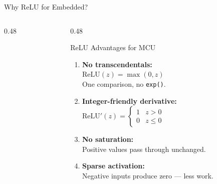 \documentclass[aspectratio=169, 10pt]{beamer}
\begin{document}
\begin{frame}{Why ReLU for Embedded?}
\begin{columns}[T]
\begin{column}{0.48\textwidth}
\begin{center}
\end{center}
\end{column}

\begin{column}{0.48\textwidth}
\begin{block}{ReLU Advantages for MCU}
\begin{enumerate}
  \item \textbf{No transcendentals:}\\
    $\text{ReLU}(z) = \max(0, z)$\\
    One comparison, no \texttt{exp()}.
  \item \textbf{Integer-friendly derivative:}\\
    $\text{ReLU}'(z) = \begin{cases} 1 & z > 0 \\ 0 & z \leq 0 \end{cases}$
  \item \textbf{No saturation:}\\
    Positive values pass through unchanged.
  \item \textbf{Sparse activation:}\\
    Negative inputs produce zero --- less work.
\end{enumerate}
\end{block}
\end{column}
\end{columns}
\end{frame}

\end{document}
